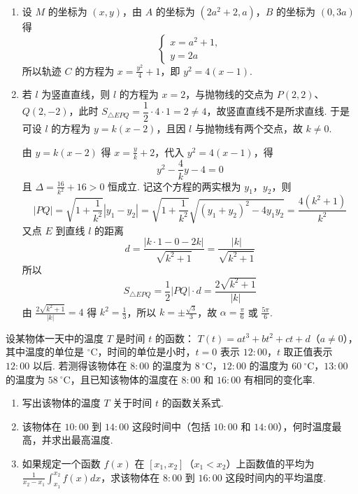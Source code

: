 \documentclass[UTF8,a4paper,oneside,11pt]{ctexbook}
\begin{document}
\begin{solution}
\begin{enumerate}
\item 设 \(M\) 的坐标为 \((x,y)\)，由 \(A\) 的坐标为 \((2a^{2}+2,a)\)，\(B\) 的坐标为 \((0,3a)\) 得
\[
\begin{cases}
x=a^{2}+1,\\
y=2a
\end{cases}
\]
所以轨迹 \(C\) 的方程为 \(x=\frac{y^{2}}{4}+1\)，即 \(y^{2}=4(x-1)\).

\item
若 \(l\) 为竖直直线，则 \(l\) 的方程为 \(x=2\)，与抛物线的交点为 \(P(2,2)\)、\(Q(2,-2)\)，此时 \(S_{\triangle EPQ}=\dfrac12\cdot4\cdot1=2\ne4\)，故竖直直线不是所求直线. 于是可设 \(l\) 的方程为 \(y=k(x-2)\)，且因 \(l\) 与抛物线有两个交点，故 \(k\neq0\).


由 \(y=k(x-2)\) 得 \(x=\frac{y}{k}+2\)，代入 \(y^{2}=4(x-1)\)，得
\[
y^{2}-\frac{4}{k}y-4=0
\]
且 \(\Delta=\frac{16}{k^{2}}+16>0\) 恒成立. 记这个方程的两实根为 \(y_{1}\)，\(y_{2}\)，则
\[
|PQ|=\sqrt{1+\frac{1}{k^{2}}}|y_{1}-y_{2}|
=\sqrt{1+\frac{1}{k^{2}}}\sqrt{(y_{1}+y_{2})^{2}-4y_{1}y_{2}}
=\frac{4(k^{2}+1)}{k^{2}}
\]
又点 \(E\) 到直线 \(l\) 的距离
\[
d=\frac{|k\cdot1-0-2k|}{\sqrt{k^{2}+1}}=\frac{|k|}{\sqrt{k^{2}+1}}
\]
所以
\[
S_{\triangle EPQ}=\frac{1}{2}|PQ|\cdot d=\frac{2\sqrt{k^{2}+1}}{|k|}
\]
由 \(\frac{2\sqrt{k^{2}+1}}{|k|}=4\) 得 \(k^{2}=\frac{1}{3}\)，所以 \(k=\pm\frac{\sqrt{3}}{3}\)，故 \(\alpha=\frac{\pi}{6}\) 或 \(\frac{5\pi}{6}\).

\end{enumerate}
\end{solution}

\begin{problem}
设某物体一天中的温度 \(T\) 是时间 \(t\) 的函数： \(T(t) = at^{3} + bt^{2} + ct + d\)（\(a \neq 0\)），其中温度的单位是 \(^{\circ}\mathrm{C}\)，时间的单位是小时，\(t = 0\) 表示 \(12{:}00\)，\(t\) 取正值表示 \(12{:}00\) 以后. 若测得该物体在 \(8{:}00\) 的温度为 \(8\mathrm{~^{\circ}C}\)，\(12{:}00\) 的温度为 \(60\mathrm{~^{\circ}C}\)，\(13{:}00\) 的温度为 \(58\mathrm{~^{\circ}C}\)，且已知该物体的温度在 \(8{:}00\) 和 \(16{:}00\) 有相同的变化率.

\begin{enumerate}
\item 写出该物体的温度 \(T\) 关于时间 \(t\) 的函数关系式.
\item 该物体在 \(10{:}00\) 到 \(14{:}00\) 这段时间中（包括 \(10{:}00\) 和 \(14{:}00\)），何时温度最高，并求出最高温度.
\item 如果规定一个函数 \(f(x)\) 在 \([x_1, x_2]\)（\(x_1 < x_2\)）上函数值的平均为 \(\frac{1}{x_2 - x_1} \int_{x_1}^{x_2} f(x) dx\)，求该物体在 \(8{:}00\) 到 \(16{:}00\) 这段时间内的平均温度.
\end{enumerate}
\end{problem}
\end{document}
